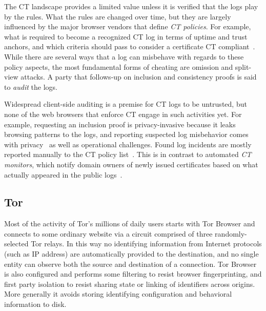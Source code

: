 The CT landscape provides a limited value unless it is verified that the logs
play by the rules.  What the rules are changed over time, but they are largely
influenced by the major browser vendors that define \emph{CT policies}.  For
example, what is required to become a recognized CT log in terms of uptime and
trust anchors, and which criteria should pass to consider a certificate CT
compliant~\cite{chrome-policy,safari-policy}.  While there are several ways that
a log can misbehave with regards to these policy aspects, the most fundamental
forms of cheating are omission and split-view attacks.  A party that follows-up
on inclusion and consistency proofs is said to \emph{audit} the logs.

Widespread client-side auditing is a premise for CT logs to be untrusted, but
none of the web browsers that enforce CT engage in such activities yet.  For
example, requesting an inclusion proof is privacy-invasive because it leaks
browsing patterns to the logs, and reporting suspected log misbehavior comes
with privacy~\cite{ct-with-privacy} as well as operational challenges.
Found log incidents are mostly reported manually to the CT policy
list~\cite{ct-policy-mailing-list}.  This is in contrast to automated
\emph{CT monitors}, which notify domain owners
of newly issued certificates based on what actually appeared in the public
logs~\cite{lwm,ct-monitors}.

\subsection{Tor} \label{sec:background:tor}

Most of the activity of Tor's millions of daily users starts with Tor Browser
and connects to some ordinary website via a circuit comprised of three
randomly-selected Tor relays. In this way no identifying information from
Internet protocols (such as IP address) are automatically provided to the
destination, and no single entity can observe both the source and destination of
a connection. Tor Browser is also configured and performs some filtering to resist
browser fingerprinting, and first party isolation to resist sharing state or
linking of identifiers across origins. More generally it avoids storing
identifying configuration and behavioral information to disk.

